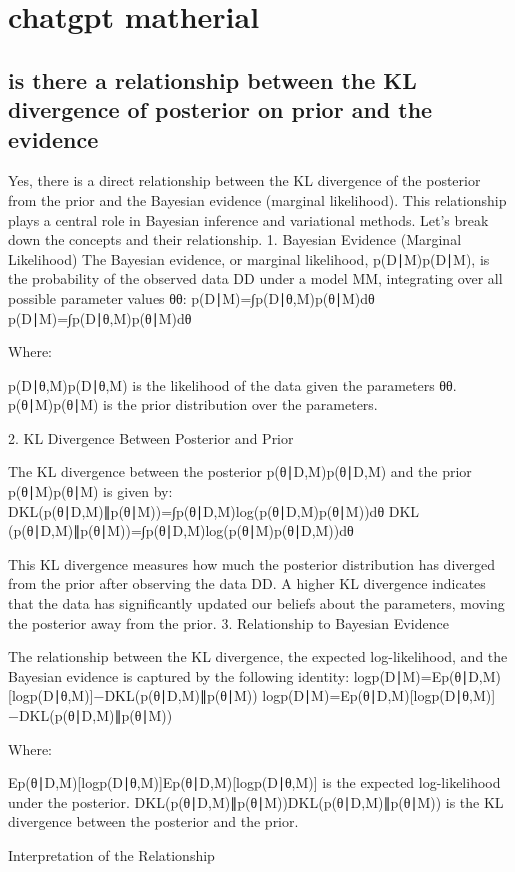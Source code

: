 \documentclass[pdflatex,sn-mathphys-num]{sn-jnl}%
\theoremstyle{thmstyleone}%
\theoremstyle{thmstyletwo}%
\theoremstyle{thmstylethree}%
\begin{document}
\section{chatgpt matherial}
\subsection{is there a relationship between the KL divergence of posterior on prior and the evidence}
	Yes, there is a direct relationship between the KL divergence of the posterior from the prior and the Bayesian evidence (marginal likelihood). This relationship plays a central role in Bayesian inference and variational methods. Let’s break down the concepts and their relationship.
	1. Bayesian Evidence (Marginal Likelihood)
    The Bayesian evidence, or marginal likelihood, p(D∣M)p(D∣M), is the probability of the observed data DD under a model MM, integrating over all possible parameter values θθ:
	p(D∣M)=∫p(D∣θ,M)p(θ∣M)dθ
	p(D∣M)=∫p(D∣θ,M)p(θ∣M)dθ
	
	Where:
	
	p(D∣θ,M)p(D∣θ,M) is the likelihood of the data given the parameters θθ.
	p(θ∣M)p(θ∣M) is the prior distribution over the parameters.
	
	2. KL Divergence Between Posterior and Prior
	
	The KL divergence between the posterior p(θ∣D,M)p(θ∣D,M) and the prior p(θ∣M)p(θ∣M) is given by:
	DKL(p(θ∣D,M)∥p(θ∣M))=∫p(θ∣D,M)log⁡(p(θ∣D,M)p(θ∣M))dθ
	DKL​(p(θ∣D,M)∥p(θ∣M))=∫p(θ∣D,M)log(p(θ∣M)p(θ∣D,M)​)dθ
	
	This KL divergence measures how much the posterior distribution has diverged from the prior after observing the data DD. A higher KL divergence indicates that the data has significantly updated our beliefs about the parameters, moving the posterior away from the prior.
	3. Relationship to Bayesian Evidence
	
	The relationship between the KL divergence, the expected log-likelihood, and the Bayesian evidence is captured by the following identity:
	log⁡p(D∣M)=Ep(θ∣D,M)[log⁡p(D∣θ,M)]−DKL(p(θ∣D,M)∥p(θ∣M))
	logp(D∣M)=Ep(θ∣D,M)​[logp(D∣θ,M)]−DKL​(p(θ∣D,M)∥p(θ∣M))
	
	Where:
	
	Ep(θ∣D,M)[log⁡p(D∣θ,M)]Ep(θ∣D,M)​[logp(D∣θ,M)] is the expected log-likelihood under the posterior.
	DKL(p(θ∣D,M)∥p(θ∣M))DKL​(p(θ∣D,M)∥p(θ∣M)) is the KL divergence between the posterior and the prior.
	
	Interpretation of the Relationship
	
\end{document}
